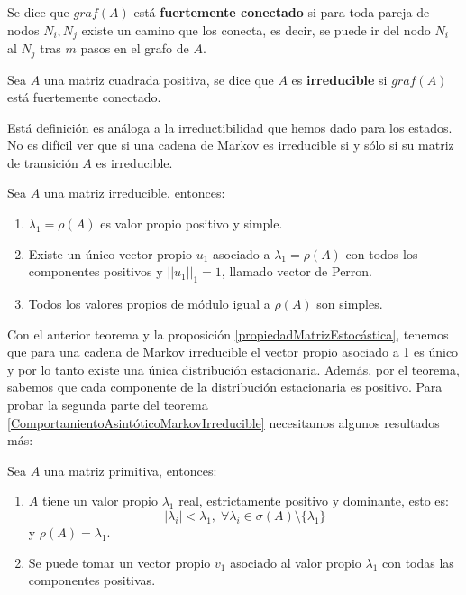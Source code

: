\begin{definition}
Se dice que $graf(A)$ está \textbf{fuertemente conectado} si para toda pareja de nodos $N_i, N_j$ existe un camino que los conecta, es decir, se puede ir del nodo $N_i$ al $N_j$ tras $m$ pasos en el grafo de $A$.
\end{definition}

\begin{definition}
Sea $A$ una matriz cuadrada positiva, se dice que $A$ es \textbf{irreducible} si $graf(A)$ está fuertemente conectado.
\end{definition}

Está definición es análoga a la irreductibilidad que hemos dado para los estados. No es difícil ver que si una cadena de Markov es irreducible si y sólo si su matriz de transición $A$ es irreducible.

\begin{theorem}
    Sea $A$ una matriz irreducible, entonces:
    \begin{enumerate}
        \item $\lambda_1=\rho(A)$ es valor propio positivo y simple.
        \item Existe un único vector propio $u_1$ asociado a $\lambda_1=\rho(A)$ con todos los componentes positivos y $||u_1||_1=1$, llamado vector de Perron.
        \item Todos los valores propios de módulo igual a $\rho(A)$ son simples.
    \end{enumerate}
\end{theorem}
Con el anterior teorema y la proposición \ref{propiedadMatrizEstocástica}, tenemos que para una cadena de Markov irreducible el vector propio asociado a 1 es único y por lo tanto existe una única distribución estacionaria. Además, por el teorema, sabemos que cada componente de la distribución estacionaria es positivo. Para probar la segunda parte del teorema \ref{ComportamientoAsintóticoMarkovIrreducible} necesitamos algunos resultados más:

\begin{theorem}
    Sea $A$ una matriz primitiva, entonces:
    \begin{enumerate}
        \item $A$ tiene un valor propio $\lambda_1$ real, estrictamente positivo y dominante, esto es:
        \[|\lambda_i|<\lambda_1,\; \forall\lambda_i\in\sigma(A)\setminus \{\lambda_1\}\]
        y $\rho(A)=\lambda_1$.
        \item Se puede tomar un vector propio $v_1$ asociado al valor propio $\lambda_1$ con todas las componentes positivas.
    \end{enumerate}
\end{theorem}

